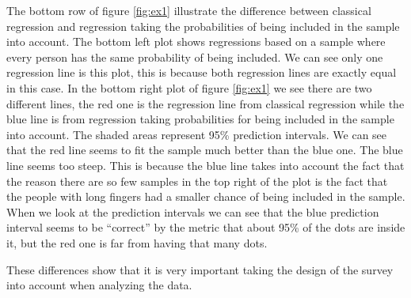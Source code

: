 \documentclass{article}
\begin{document}
\begin{example}
\begin{figure}
\end{figure}


The bottom row of figure \ref{fig:ex1} illustrate the difference between
classical regression and regression taking the probabilities of being included
in the sample into account. The bottom left plot shows regressions based on a
sample where every person has the same probability of being included. We can see
only one regression line is this plot, this is because both regression lines are
exactly equal in this case. In the bottom right plot of figure \ref{fig:ex1} we
see there are two different lines, the red one is the regression line from
classical regression while the blue line is from regression taking probabilities
for being included in the sample into account. The shaded areas represent 95\%
prediction intervals. We can see that the red line seems to fit the sample much
better than the blue one. The blue line seems too steep. This is because the
blue line takes into account the fact that the reason there are so few samples
in the top right of the plot is the fact that the people with long fingers had a
smaller chance of being included in the sample. When we look at the prediction
intervals we can see that the blue prediction interval seems to be ``correct''
by the metric that about 95\% of the dots are inside it, but the red one is far
from having that many dots.

These differences show that it is very important taking the design of the survey
into account when analyzing the data.


\end{example}
\end{document}
